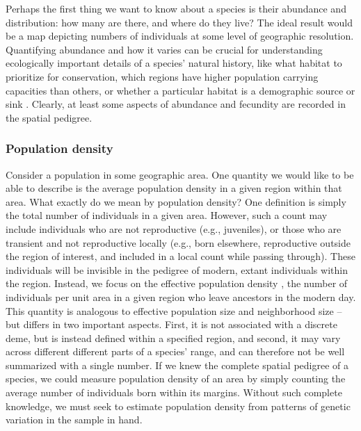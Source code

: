 \documentclass{ar-1col}
\newcommand{\todo}[1]{{\textbf{\color{red}{#1}}}}
\begin{document}
Perhaps the first thing we want to know about a species
is their abundance and distribution:
how many are there, and where do they live?
The ideal result would be a map depicting numbers of individuals
at some level of geographic resolution.
Quantifying abundance and how it varies
can be crucial for understanding
ecologically important details of a species' natural history,
like what habitat to prioritize for conservation, 
which regions have higher population carrying capacities than others, 
or whether a particular habitat is a demographic source or sink 
\citep{pulliam1988sources,schreiber2010interactive}.
Clearly, at least some aspects of abundance and fecundity are recorded in the spatial pedigree.

\subsubsection{Population density}

\todo{tidy up and tie together}

Consider a population in some geographic area. 
One quantity we would like to be able to describe 
is the average population density in a given region within that area.
What exactly do we mean by population density?
One definition is simply the total number of individuals in a given area.
However, such a count may include 
individuals who are not reproductive (e.g., juveniles), 
or those who are transient and not reproductive locally 
(e.g., born elsewhere, reproductive outside the region of interest, 
and included in a local count while passing through).
These individuals will be invisible in the pedigree 
of modern, extant individuals within the region.
Instead, we focus on the effective population density \citep{barton-depaulis-etheridge}, 
the number of individuals per unit area in a given region 
who leave ancestors in the modern day.
This quantity is analogous to effective population size \citep{wright1931evolution}
and neighborhood size \citep{Wright1943,wright1946isolation} -- 
but differs in two important aspects.
First, 
it is not associated with a discrete deme, 
but is instead defined within a specified region, 
and second, 
it may vary across different different parts of a species' range, 
and can therefore not be well summarized with a single number.
If we knew the complete spatial pedigree of a species, 
we could measure population density of an area 
by simply counting the average number of individuals born within its margins.
Without such complete knowledge, 
we must seek to estimate population density from patterns of genetic variation 
in the sample in hand.
\end{document}
